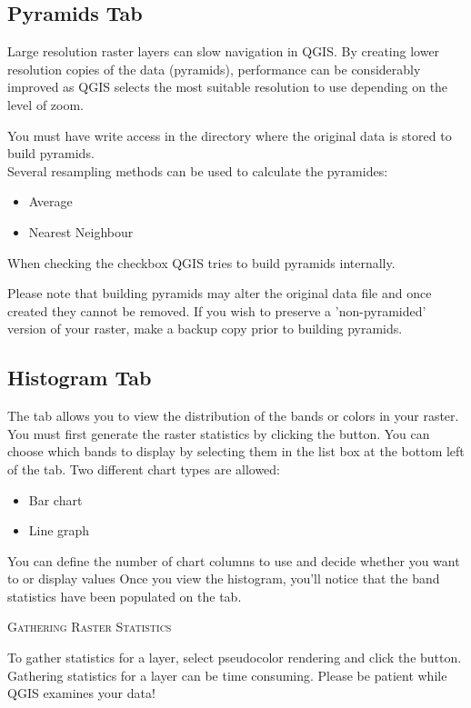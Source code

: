 \subsection{Pyramids Tab}\label{raster_pyramids}

Large resolution raster layers can slow navigation in QGIS. By creating lower
resolution copies of the data (pyramids), performance can be considerably
improved as QGIS selects the most suitable resolution to use depending on the
level of zoom.

You must have write access in the directory where the original data is stored
to build pyramids. \\
Several resampling methods can be used to calculate the pyramides:
\begin{itemize}[label=--]
\item Average
\item Nearest Neighbour
\end{itemize}

When checking the checkbox  QGIS tries to build pyramids internally.

Please note that building pyramids may alter the original data file and once
created they cannot be removed. If you wish to preserve a 'non-pyramided'
version of your raster, make a backup copy prior to building pyramids.

\subsection{Histogram Tab}\label{label_histogram}

The  tab allows you to view the distribution 
of the bands or colors in your raster. You must first generate the raster statistics 
by clicking the  button. You can choose which bands to display by 
selecting them in the list box at the bottom left of the tab. Two different
chart types are allowed: 

\begin{itemize}[label=--]
\item Bar chart
\item Line graph
\end{itemize}

You can define the number of chart columns to use and decide whether you want 
to  or display  values 
Once you view the histogram, you'll notice that the band statistics have been
populated on the  tab.

\begin{Tip}\caption{\textsc{Gathering Raster Statistics}}
To gather statistics for a layer, select pseudocolor rendering and
click the  button. Gathering statistics for a layer can be time
consuming. Please be patient while QGIS examines your
data!
\end{Tip}

\FloatBarrier
